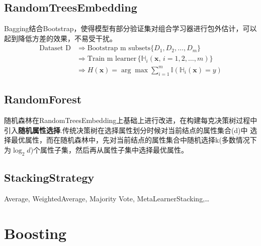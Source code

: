 \documentclass[a4paper]{article}
\begin{document}
	\subsection{RandomTreesEmbedding}
		Bagging结合Bootstrap，使得模型有部分验证集对组合学习器进行包外估计，可以起到降低方差的效果，不易受干扰。
		\begin{align*}
			\text{Dataset D}	& \Rightarrow \text{Bootstrap m subsets}\{D_1, D_2,\dots, D_m\}\\
					  			& \Rightarrow \text{Train m learner}\,\{\mathbb{H}_i(\textbf{x},\, i=1,2,\dots, m)\}\\
					  			& \Rightarrow H(\textbf{x}) = \arg\max \sum\nolimits_{i=1}^{m}\mathbb{I}\left(\mathbb{H}_i(\textbf{x})=y\right)
		\end{align*}
	\subsection{RandomForest}
	随机森林在RandomTreesEmbedding上基础上进行改进，在构建每克决策树过程中引入\textbf{随机属性选择}.传统决策树在选择属性划分时候对当前结点的属性集合(d)中
	选择最优属性，而在随机森林中，先对当前结点的属性集合中随机选择k(多数情况下为$\log_2d$)个属性子集，然后再从属性子集中选择最优属性。
	\subsection{StackingStrategy}
		Average, WeightedAverage, Majority Vote, MetaLearnerStacking,\dots
\section{Boosting}
\end{document}
